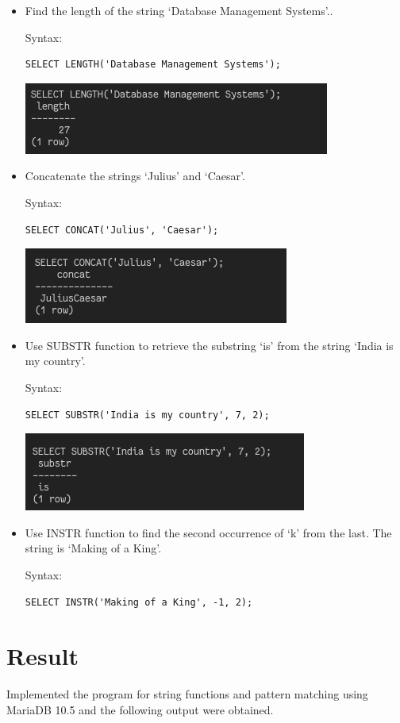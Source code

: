\documentclass[13pt,oneside]{book}
\begin{document}
\begin{itemize}
\item
Find the length of the string ‘Database Management Systems’..
 
Syntax:
\begin{verbatim}
SELECT LENGTH('Database Management Systems');

\end{verbatim}
\includegraphics[]{img/p6/ss19.png}


\item
Concatenate the strings ‘Julius’ and ‘Caesar’.
 
Syntax:
\begin{verbatim}
SELECT CONCAT('Julius', 'Caesar');

\end{verbatim}
\includegraphics[]{img/p6/ss20.png}


\item
Use SUBSTR function to retrieve the substring ‘is’ from the string ‘India is
 my country’.
 
Syntax:
\begin{verbatim}
SELECT SUBSTR('India is my country', 7, 2);

\end{verbatim}
\includegraphics[]{img/p6/ss21.png}


\item
Use INSTR function to find the second occurrence of ‘k’ from the last. The
 string is ‘Making of a King’.

Syntax:
\begin{verbatim}
SELECT INSTR('Making of a King', -1, 2);

\end{verbatim}
\end{itemize}
\section*{Result}
Implemented the program for string functions and pattern matching using MariaDB 10.5 and the following output
	were obtained.
\end{document}
